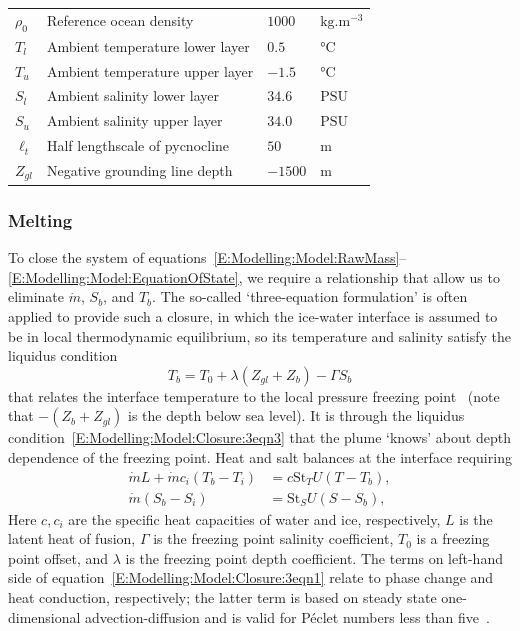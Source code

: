 \documentclass[openacc]{rsproca_new}%
\begin{document}
\begin{table}[!h]
\begin{center}
\begin{tabular}{llll}
$\rho_0$ &  Reference ocean density & $1000$ & $\si{\kilogram . \meter^{-3}}$\\
$T_{l}$ & Ambient temperature lower layer &$0.5$        &  $\si{ \celsius}$   \\
$T_{u}$ & Ambient temperature upper layer &$-1.5$        &  $\si{ \celsius}$  \\
$S_{l}$ & Ambient salinity lower layer &$34.6$        &  $\text{PSU}$   \\
$S_{u}$ & Ambient salinity upper layer &$34.0$        &  $\text{PSU}$  \\
$\ell_t$ & Half lengthscale of pycnocline & $50$ & $\si{\meter}$\\
$Z_{gl}$ & Negative grounding line depth & $-1500$ & $\si{\meter}$\\

\hline
\end{tabular}
\end{center}
\vspace*{-4pt}
\end{table}

\subsubsection{Melting}
To close the system of equations~\eqref{E:Modelling:Model:RawMass}--\eqref{E:Modelling:Model:EquationOfState}, we require a relationship that allow us to eliminate $\dot{m}$, $S_b$, and $T_b$.  The so-called `three-equation formulation' is often applied to provide such a closure, in which the ice-water interface is assumed to be in local thermodynamic equilibrium, so its temperature and salinity satisfy the liquidus condition 
\begin{equation}
    T_b = T_0 + \lambda (Z_{gl} + Z_b) - \Gamma S_b\label{E:Modelling:Model:Closure:3eqn3}
\end{equation}
that relates the interface temperature to the local pressure freezing point~\citep{Holland1999JPhysOcean} (note that $-(Z_b + Z_{gl})$ is the depth below sea level). It is through the liquidus condition~\eqref{E:Modelling:Model:Closure:3eqn3} that the plume `knows' about depth dependence of the freezing point. Heat and salt balances at the interface requiring
\begin{align}
\dot{m}L + \dot{m}c_i (T_b - T_i) &= c \mathrm{St}_T U(T - T_b),\label{E:Modelling:Model:Closure:3eqn1}\\
\dot{m}(S_b - S_i) &= \mathrm{St}_S U(S - S_b),\label{E:Modelling:Model:Closure:3eqn2}
\end{align}  
Here $c, c_i$ are the specific heat capacities of water and ice, respectively, $L$ is the latent heat of fusion, $\Gamma$ is the freezing point salinity coefficient,  $T_0$ is a freezing point offset, and $\lambda$ is the freezing point depth coefficient. The terms on left-hand side of equation~\eqref{E:Modelling:Model:Closure:3eqn1} relate to phase change and heat conduction, respectively; the latter term is based on steady state one-dimensional advection-diffusion and is valid for P\'{e}clet numbers less than five~\citep{Holland1999JPhysOcean}.
\end{document}
